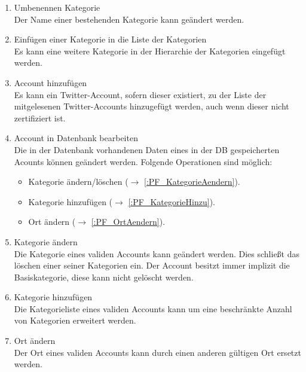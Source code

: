 \begin{enumerate}[ align=left, label={\textbf{\textbackslash F40\arabic*0\textbackslash}}]
	\item Umbenennen Kategorie \label{:PF_KategorieUm} \\
	Der Name einer bestehenden Kategorie kann geändert werden.
	\item Einfügen einer Kategorie in die Liste der Kategorien  \label{:PF_KategorieHinzu} \\
	Es kann eine weitere Kategorie in der Hierarchie der Kategorien eingefügt werden.
	\item Account hinzufügen \label{:PF_AccountHinzu} \\
	Es kann ein Twitter-Account, sofern dieser existiert, zu der Liste der mitgelesenen Twitter-Accounts hinzugefügt werden, auch wenn dieser nicht zertifiziert ist.
	\item Account in Datenbank bearbeiten \label{:PF_AccountBearbeiten} \\
	Die in der Datenbank vorhandenen Daten eines in der DB gespeicherten Acounts können geändert werden. Folgende Operationen sind möglich:
	\begin{itemize}
		\item Kategorie ändern/löschen ($\rightarrow$ \ref{:PF_KategorieAendern}).
		\item Kategorie hinzufügen ($\rightarrow$ \ref{:PF_KategorieHinzu}).
		\item Ort ändern ($\rightarrow$ \ref{:PF_OrtAendern}).
	\end{itemize}
	\item Kategorie ändern \label{:PF_KategorieAendern} \\
	Die Kategorie eines validen Accounts kann geändert werden. Dies schließt das löschen einer seiner Kategorien ein. Der Account besitzt immer implizit die Basiskategorie, diese kann nicht gelöscht werden.
	\item Kategorie hinzufügen \label{:PF_KategorieHinzu} \\
	Die Kategorieliste eines validen Accounts kann um eine beschränkte Anzahl von Kategorien erweitert werden. 
	\item Ort ändern \label{:PF_OrtAendern} \\
	Der Ort eines validen Accounts kann durch einen anderen gültigen Ort ersetzt werden.
\end{enumerate}
